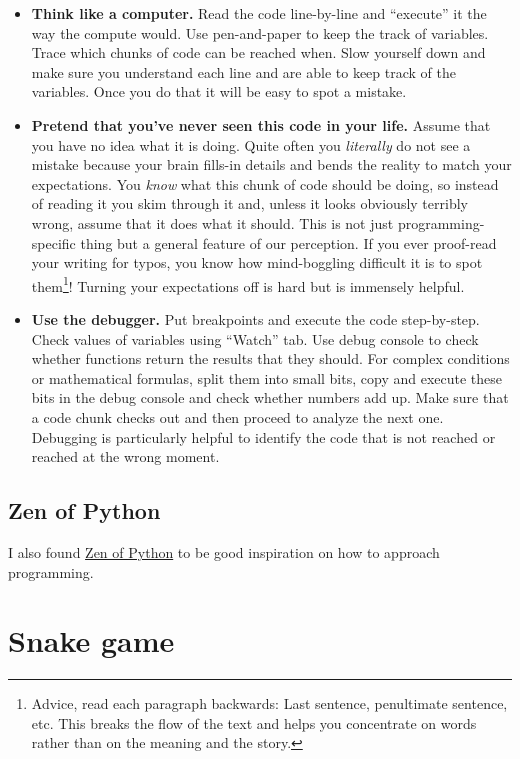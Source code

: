 \documentclass[
]{book}
\begin{document}
\begin{itemize}
\item
  \textbf{Think like a computer.} Read the code line-by-line and ``execute'' it the way the compute would. Use pen-and-paper to keep the track of variables. Trace which chunks of code can be reached when. Slow yourself down and make sure you understand each line and are able to keep track of the variables. Once you do that it will be easy to spot a mistake.
\item
  \textbf{Pretend that you've never seen this code in your life.} Assume that you have no idea what it is doing. Quite often you \emph{literally} do not see a mistake because your brain fills-in details and bends the reality to match your expectations. You \emph{know} what this chunk of code should be doing, so instead of reading it you skim through it and, unless it looks obviously terribly wrong, assume that it does what it should. This is not just programming-specific thing but a general feature of our perception. If you ever proof-read your writing for typos, you know how mind-boggling difficult it is to spot them\footnote{Advice, read each paragraph backwards: Last sentence, penultimate sentence, etc. This breaks the flow of the text and helps you concentrate on words rather than on the meaning and the story.}! Turning your expectations off is hard but is immensely helpful.
\item
  \textbf{Use the debugger.} Put breakpoints and execute the code step-by-step. Check values of variables using ``Watch'' tab. Use debug console to check whether functions return the results that they should. For complex conditions or mathematical formulas, split them into small bits, copy and execute these bits in the debug console and check whether numbers add up. Make sure that a code chunk checks out and then proceed to analyze the next one. Debugging is particularly helpful to identify the code that is not reached or reached at the wrong moment.
\end{itemize}

\hypertarget{zen-of-python}{%
\section{Zen of Python}\label{zen-of-python}}

I also found \href{https://www.python.org/dev/peps/pep-0020/}{Zen of Python} to be good inspiration on how to approach programming.

\hypertarget{seminar-02-01}{%
\chapter{Snake game}\label{seminar-02-01}}
\end{document}
